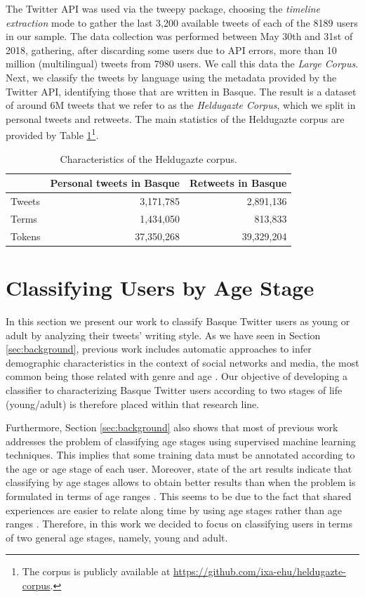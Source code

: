 \documentclass[information,article,submit,moreauthors,pdftex,10pt,a4paper]{Definitions/mdpi}
\begin{document}
The Twitter API was used via the tweepy package, choosing the \textit{timeline extraction} mode to gather the last 3,200 available tweets of each of the 8189 users in our sample. The data collection was performed between May 30th and 31st of 2018, gathering, after discarding some users due to API errors, more than 10 million (multilingual) tweets from 7980 users. We call this data the \emph{Large Corpus}. Next, we classify the tweets by language using the metadata provided by the Twitter API, identifying those that are written in Basque. The result is a dataset of around 6M tweets that we refer to as the \emph{Heldugazte Corpus}, which we split in personal tweets and retweets. The main statistics of the Heldugazte corpus are provided by Table \ref{tab:useful-data}\footnote{The corpus is publicly available at \url{https://github.com/ixa-ehu/heldugazte-corpus}.}.

\begin{table}[H]
  \centering
  \begin{tabular}{lrr} \hline
     & Personal tweets in Basque & Retweets in Basque \\ \hline \hline
    Tweets & 3,171,785 & 2,891,136 \\
    Terms & 1,434,050 & 813,833 \\
    Tokens & 37,350,268 & 39,329,204 \\ \hline
  \end{tabular}
  \caption{Characteristics of the Heldugazte corpus.}
  \label{tab:useful-data}
\end{table}

\section{Classifying Users by Age Stage}\label{sec:class-young-users}

In this section we present our work to classify Basque Twitter users as young or adult by analyzing their tweets' writing style. As we have seen in Section \ref{sec:background}, previous work includes automatic approaches to infer demographic characteristics in the context of social networks and media, the most common being those related with genre and age \citep{cesare2017detection}. Our objective of developing a classifier to characterizing Basque Twitter users according to two stages of life (young/adult) is therefore placed within that research line.

Furthermore, Section \ref{sec:background} also shows that most of previous work addresses the problem of classifying age stages using supervised machine learning techniques. This implies that some training data must be annotated according to the age or age stage of each user. Moreover, state of the art results indicate that classifying by age stages allows to obtain better results than when the problem is formulated in terms of age ranges \citep{nguyen2013old}. This seems to be due to the fact that shared experiences are easier to relate along time by using age stages rather than age ranges \citep{nguyen2016computational,eckert2017age}. Therefore, in this work we decided to focus on classifying users in terms of two general age stages, namely, young and adult.
\end{document}
